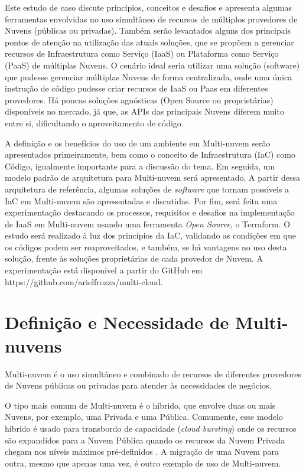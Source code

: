 \documentclass[12pt]{article}
\begin{document}
	Este estudo de caso discute princípios, conceitos e desafios e apresenta algumas ferramentas envolvidas no uso simultâneo de recursos de múltiplos provedores de Nuvens (públicas ou privadas). Também serão levantados alguns dos principais pontos de atenção na utilização das atuais soluções, que se propõem a gerenciar recursos de Infraestrutura como Serviço (IaaS) ou Plataforma como Serviço (PaaS) de múltiplas Nuvens. O cenário ideal seria utilizar uma solução (software) que pudesse gerenciar múltiplas Nuvens de forma centralizada, onde uma única instrução de código pudesse criar recursos de IaaS ou Paas em diferentes provedores. Há poucas soluções agnósticas (Open Source ou proprietárias) disponíveis no mercado, já que, as APIs das principais Nuvens diferem muito entre si, dificultando o aproveitamento de código.
	    
	A definição e os benefícios do uso de um ambiente em Multi-nuvem serão apresentados primeiramente, bem como o conceito de Infraestrutura (IaC) como Código, igualmente importante para a discussão do tema. Em seguida, um modelo padrão de arquitetura para Multi-nuvem será apresentado. A partir dessa arquitetura de referência, algumas soluções de \textit{software} que tornam possíveis a IaC em Multi-nuvem são apresentadas e discutidas. Por fim, será feita uma experimentação destacando os processos, requisitos e desafios na implementação de IaaS em Multi-nuvem usando uma ferramenta \textit{Open Source}, o Terraform. O estudo será realizado à luz dos princípios da IaC, validando as condições em que os códigos podem ser reaproveitados, e também, se há vantagens no uso desta solução, frente às soluções proprietárias de cada provedor de Nuvem. A experimentação está disponível a partir do GitHub em https://github.com/arielfrozza/multi-cloud.
		
	\section{Definição e Necessidade de Multi-nuvens}
	
	Multi-nuvem é o uso simultâneo e combinado de recursos de diferentes provedores de Nuvens públicas ou privadas para atender às necessidades de negócios.
	
	O tipo mais comum de Multi-nuvem é o híbrido, que envolve duas ou mais Nuvens, por exemplo, uma Privada e uma Pública. Comumente, esse modelo híbrido é usado para transbordo de capacidade (\textit{cloud bursting}) onde os recursos são expandidos para a Nuvem Pública quando os recursos da Nuvem Privada chegam nos níveis máximos pré-definidos \cite{Ferrer:2012}. A migração de uma Nuvem para outra, mesmo que apenas uma vez, é outro exemplo de uso de Multi-nuvem.
	
\end{document}
